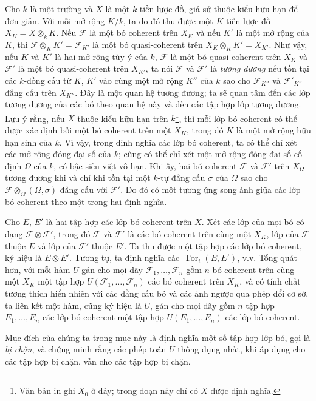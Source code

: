 Cho $k$ là một trường và $X$ là một $k$-tiền lược đồ, giả sử thuộc kiểu hữu hạn
để đơn giản. Với mỗi mở rộng $K/k$, ta do đó thu được một $K$-tiền lược đồ
$X_K=X\otimes_k K$. Nếu $\mathcal F$ là một bó coherent trên $X_K$ và nếu
$K'$ là một mở rộng của $K$, thì
$\mathcal F\otimes_K K'=\mathcal F_{K'}$ là một bó quasi-coherent trên
$X_K\otimes_K K'=X_{K'}$. Như vậy, nếu $K$ và $K'$ là hai mở rộng tùy ý của
$k$, $\mathcal F$ là một bó quasi-coherent trên $X_K$ và $\mathcal F'$
là một bó quasi-coherent trên $X_{K'}$, ta nói $\mathcal F$ và
$\mathcal F'$ là \emph{tương đương} nếu tồn tại các $k$-đồng cấu từ $K$,
$K'$ vào cùng một mở rộng $K''$ của $k$ sao cho $\mathcal F_{K''}$ và
$\mathcal F'_{K''}$ đẳng cấu trên $X_{K''}$. Đây là một quan hệ tương đương;
ta sẽ quan tâm đến các lớp tương đương của các bó theo quan hệ này và đến các
tập hợp lớp tương đương. Lưu ý rằng, nếu $X$ thuộc kiểu hữu hạn trên
$k$\footnote{Văn bản in ghi $X_0$ ở đây; trong đoạn này chỉ có $X$ được định
nghĩa.}, thì mỗi lớp bó coherent có thể được xác định bởi một bó coherent trên
một $X_K$, trong đó $K$ là một mở rộng hữu hạn sinh của $k$. Vì vậy, trong
định nghĩa các lớp bó coherent, ta có thể chỉ xét các mở rộng đóng đại số của
$k$; cũng có thể chỉ xét một mở rộng đóng đại số cố định $\Omega$ của $k$, có
bậc siêu việt vô hạn. Khi ấy, hai bó coherent $\mathcal F$ và $\mathcal F'$
trên $X_\Omega$ tương đương khi và chỉ khi tồn tại một $k$-tự đẳng cấu $\sigma$
của $\Omega$ sao cho $\mathcal F\otimes_\Omega(\Omega,\sigma)$ đẳng cấu với
$\mathcal F'$. Do đó có một tương ứng song ánh giữa các lớp bó coherent theo
một trong hai định nghĩa.

Cho $E$, $E'$ là hai tập hợp các lớp bó coherent trên $X$. Xét các lớp của mọi
bó có dạng $\mathcal F\otimes\mathcal F'$, trong đó $\mathcal F$ và
$\mathcal F'$ là các bó coherent trên cùng một $X_K$, lớp của $\mathcal F$
thuộc $E$ và lớp của $\mathcal F'$ thuộc $E'$. Ta thu được một tập hợp các lớp
bó coherent, ký hiệu là $E\otimes E'$. Tương tự, ta định nghĩa các
$\operatorname{Tor}_i(E,E')$, v.v. Tổng quát hơn, với mỗi hàm $U$ gán cho mọi
dãy $\mathcal F_1,\ldots,\mathcal F_n$ gồm $n$ bó coherent trên cùng một $X_K$
một tập hợp $U(\mathcal F_1,\ldots,\mathcal F_n)$ các bó coherent trên $X_K$,
và có tính chất tương thích hiển nhiên với các đẳng cấu bó và các ảnh ngược qua
phép đổi cơ sở, ta liên kết một hàm, cũng ký hiệu là $U$, gán cho mọi dãy gồm
$n$ tập hợp $E_1,\ldots,E_n$ các lớp bó coherent một tập hợp
$U(E_1,\ldots,E_n)$ các lớp bó coherent.

Mục đích của chúng ta trong mục này là định nghĩa một số tập hợp lớp bó, gọi là
\emph{bị chặn}, và chứng minh rằng các phép toán $U$ thông dụng nhất, khi áp
dụng cho các tập hợp bị chặn, vẫn cho các tập hợp bị chặn.

